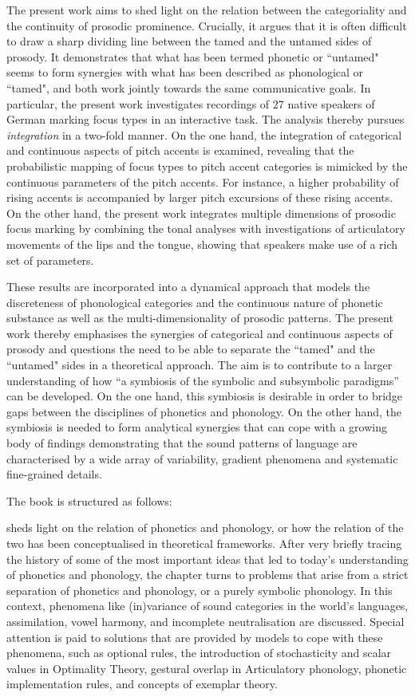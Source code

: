 The present work aims to shed light on the relation between the categoriality and the continuity of prosodic prominence. Crucially, it argues that it is often difficult to draw a sharp dividing line between the tamed and the untamed sides of prosody. It demonstrates that what has been termed phonetic or ``untamed" seems to form synergies with what has been described as phonological or ``tamed", and both work jointly towards the same communicative goals. In particular, the present work investigates recordings of 27 native speakers of German marking focus types in an interactive task. The analysis thereby pursues \emph{integration} in a two-fold manner. On the one hand, the integration of categorical and continuous aspects of pitch accents is examined, revealing that the probabilistic mapping of focus types to pitch accent categories is mimicked by the continuous parameters of the pitch accents. For instance, a higher probability of rising accents is accompanied by larger pitch excursions of these rising accents. On the other hand, the present work integrates multiple dimensions of prosodic focus marking by combining the tonal analyses with investigations of articulatory movements of the lips and the tongue, showing that speakers make use of a rich set of parameters.

These results are incorporated into a dynamical approach that models the discreteness of phonological categories and the continuous nature of phonetic substance as well as the multi-dimensionality of prosodic patterns. The present work thereby emphasises the synergies of categorical and continuous aspects of prosody and questions the need to be able to separate the ``tamed" and the ``untamed" sides in a theoretical approach. The aim is to contribute to a larger understanding of how ``a symbiosis of the symbolic and subsymbolic paradigms” \citep[19]{Smolensky1988} can be developed. On the one hand, this symbiosis is desirable in order to bridge gaps between the disciplines of phonetics and phonology. On the other hand, the symbiosis is needed to form analytical synergies that can cope with a growing body of findings  demonstrating that the sound patterns of language are characterised by a wide array of variability, gradient phenomena and systematic fine-grained details.

The book is structured as follows:


 sheds light on the relation of phonetics and phonology, or how the relation of the two has been conceptualised in theoretical frameworks. After very briefly tracing the history of some of the most important ideas that led to today's understanding of phonetics and phonology, the chapter turns to problems that arise from a strict separation of phonetics and phonology, or a purely symbolic phonology. In this context, phenomena like (in)variance of sound categories in the world's languages, assimilation, vowel harmony, and incomplete neutralisation are discussed. Special attention is paid to solutions that are provided by models to cope with these phenomena, such as optional rules, the introduction of stochasticity and scalar values in Optimality Theory, gestural overlap in Articulatory phonology, phonetic implementation rules, and concepts of exemplar\largerpage{} theory. 

